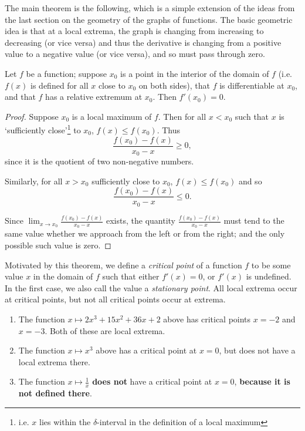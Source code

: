 The main theorem is the following, which is a simple extension of the ideas from the last section on the geometry of the graphs
of functions. The basic geometric idea is that at a local extrema, the graph is changing from increasing to decreasing (or vice versa)
and thus the derivative is changing from a positive value to a negative value (or vice versa), and so must pass through zero.

\begin{thm}[Fermat]
  Let $ f $ be a function; suppose $ x_0 $ is a point in the interior of the domain of $ f $ (i.e. $ f(x) $ is defined for all $ x $ close
  to $ x_0 $ on both sides), that $ f $ is differentiable at $ x_0 $, and that $ f $ has a relative extremum  at $ x_0 $. Then $ f'(x_0) = 0 $.
\end{thm}
\begin{proof}
  Suppose $ x_0 $ is a local maximum of $ f $. Then for all $ x < x_0 $ such that $ x $ is `sufficiently close'\footnote{i.e. $ x $ lies
  within the $ \delta$-interval in the definition of a local maximum} to $ x_0 $, $ f(x) \leq f(x_0) $. Thus
  \begin{displaymath}
    \frac{f(x_0) - f(x)}{x_0 - x} \geq 0,
  \end{displaymath}
  since it is the quotient of two non-negative numbers.

  Similarly, for all $ x > x_0 $ sufficiently close to $ x_0 $, $ f(x) \leq f(x_0) $ and so
  \begin{displaymath}
    \frac{f(x_0) - f(x)}{x_0 - x} \leq 0.
  \end{displaymath}

  Since $ \lim_{x \to x_0} \frac{f(x_0) - f(x)}{x_0 - x} $ exists, the quantity $ \frac{f(x_0) - f(x)}{x_0 - x} $ must
  tend to the same value whether we approach from the left or from the right; and the only possible such value is zero.
\end{proof}

Motivated by this theorem, we define a \emph{critical point} of a function $ f $ to be some value $ x $ in the domain of $ f $ such
that either $ f'(x) = 0 $, or $ f'(x) $ is undefined. In the first case, we also call the value a \emph{stationary point}. All local
extrema occur at critical points, but not all critical points occur at extrema.

\begin{exs}\leavevmode
  \begin{enumerate}
    \item The function $ x \mapsto 2x^3 + 15x^2 + 36x + 2 $ above has critical points $ x = -2 $ and $ x = -3 $. Both of
          these are local extrema.
    \item The function $ x \mapsto x^3 $ above has a critical point at $ x = 0 $, but does not have a local extrema there.
    \item The function $ x \mapsto \frac{1}{x} $ \textbf{does not} have a critical point at $ x = 0 $, \textbf{because it is not defined there}.
  \end{enumerate}
\end{exs}

